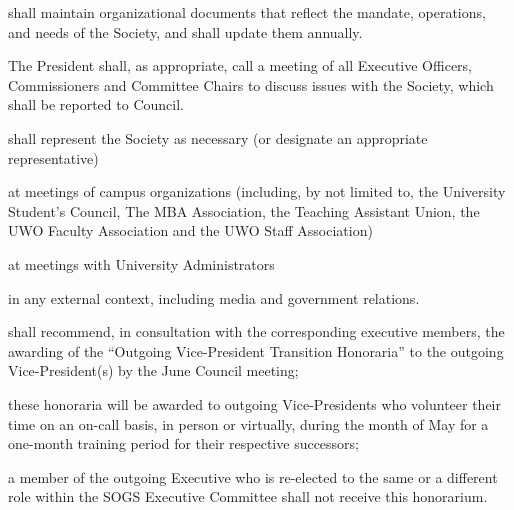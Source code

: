 \begin{longenum}[ label*=\thesubsection.\arabic*., align=left]
    \item shall maintain organizational documents that reflect the mandate, operations, and needs of the Society, and shall update them annually. 
    \item The President shall, as appropriate, call a meeting of all Executive Officers, Commissioners and Committee Chairs to discuss issues with the Society, which shall be reported to Council.
        \item shall represent the Society as necessary (or designate an appropriate representative)
        \begin{longenum}[ label*=\arabic*., align=left]
        \item at meetings of campus organizations (including, by not limited to, the University Student's Council, The MBA Association, the Teaching Assistant Union, the UWO Faculty Association and the UWO Staff Association)
        \item at meetings with University Administrators
        \item in any external context, including media and government relations.
        \end{longenum}        
        \item shall recommend, in consultation with the corresponding executive members, the awarding of the “Outgoing Vice-President Transition Honoraria” to the outgoing Vice-President(s) by the June Council meeting;
        \begin{longenum}[ label*=\arabic*., align=left]
        \item these honoraria will be awarded to outgoing Vice-Presidents who volunteer their time on an on-call basis, in person or virtually, during the month of May for a one-month training period for their respective successors;
        \item a member of the outgoing Executive who is re-elected to the same or a different role within the SOGS Executive Committee shall not receive this honorarium.
        \end{longenum}
\end{longenum}

